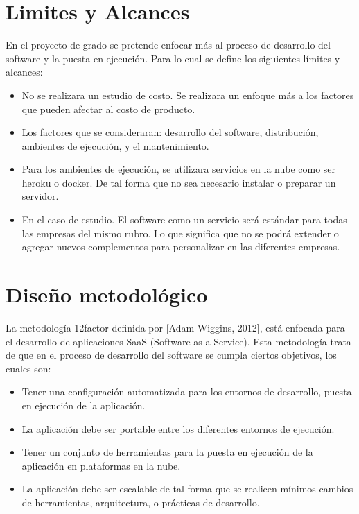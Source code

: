 \section{Limites y Alcances}
\noindent En el proyecto de grado se pretende enfocar más al proceso de desarrollo del software y la puesta en ejecución. Para lo cual se define los siguientes límites y alcances:
\begin{itemize}
  \item No se realizara un estudio de costo. Se realizara un enfoque más a los factores que pueden afectar al costo de producto.
  \item Los factores que se consideraran: desarrollo del software, distribución, ambientes de ejecución, y el mantenimiento.
  \item Para los ambientes de ejecución, se utilizara servicios en la nube como ser heroku o docker. De tal forma que no sea necesario instalar o preparar un servidor.
  \item En el caso de estudio. El software como un servicio será estándar para todas las empresas del mismo rubro. Lo que significa que no se podrá extender o agregar nuevos complementos para personalizar en las diferentes empresas.
\end{itemize}

\section{Diseño metodológico}
\noindent La metodología 12factor definida por [Adam Wiggins, 2012], está enfocada para el desarrollo de aplicaciones SaaS (Software as a Service). Esta metodología trata de que en el proceso de desarrollo del software se cumpla ciertos objetivos, los cuales son:

\begin{itemize}
  \item Tener una configuración automatizada para los entornos de desarrollo, puesta en ejecución de la aplicación.
  \item La aplicación debe ser portable entre los diferentes entornos de ejecución.
  \item Tener un conjunto de herramientas para la puesta en ejecución de la aplicación en plataformas en la nube.
  \item La aplicación debe ser escalable de tal forma que se realicen mínimos cambios de herramientas, arquitectura, o prácticas de desarrollo.
\end{itemize}

